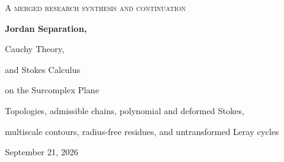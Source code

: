 \documentclass[11pt,letterpaper]{article}
\theoremstyle{definition}
\theoremstyle{remark}
\newcommand{\No}{\mathbf{No}}\newcommand{\SC}{\mathbf{SC}}
\numberwithin{equation}{section}
\begin{document}
\hypersetup{pageanchor=false}
\begin{titlepage}
\centering
\vspace*{0.6cm}
{\Large\scshape A merged research synthesis and continuation\par}
\vspace{0.75cm}
{\Huge\bfseries Jordan Separation,\par Cauchy Theory,\par and Stokes Calculus\par}
\vspace{0.4cm}
{\LARGE on the Surcomplex Plane\par}
\vspace{0.6cm}
{\large Topologies, admissible chains, polynomial and deformed Stokes,\par
multiscale contours, radius-free residues, and untransformed Leray cycles\par}
\vspace{0.6cm}
{\large September 21, 2026\par}
\vspace{0.5cm}
\begin{minipage}{0.94\textwidth}
\begin{abstract}
A counterpart of a complex-analytic theorem over $\SC=\No[i]$ must specify three
things before it has a definite meaning: a topology, a regularity algebra for the
integrand, and a category of chains with an integration pairing. The full fine
topology admits no nonconstant continuous ordinary real-parameter paths; a fixed
Hahn workspace has a different, nondiscrete but totally separated intrinsic
topology. Neither supports the literal ordinary Jordan-curve picture.


\end{abstract}
\end{minipage}
\end{titlepage}
\end{document}

